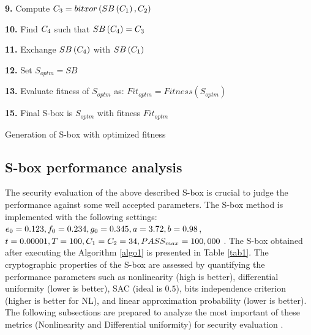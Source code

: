 \documentclass[journal]{IEEEtran/IEEEtran}
\begin{document}
\begin{algorithm}
{     
  \textbf{9.} Compute  ${C_{\rm{3}}} = bitxor\left( {SB\left( {{C_{\rm{1}}}} \right),{C_{\rm{2}}}} \right)$
   

     
  \textbf{10.} Find ${C_{\rm{4}}}$  such that $SB\left( {{C_{\rm{4}}}} \right) = {C_{\rm{3}}}$ 
   

     
  \textbf{11.} Exchange $SB\left( {{C_{\rm{4}}}} \right)$  with $SB\left( {{C_{\rm{1}}}} \right)$
   

     
  \textbf{12.} Set  ${S_{optm}} = SB$
   

     
 \textbf{13.} Evaluate fitness of ${S_{optm}}$ as: $Fi{t_{optm}} = Fitness\left( {{S_{optm}}} \right)$   
    

        
   }
   
   \textbf{15.} Final S-box is ${S_{optm}}$  with fitness $Fi{t_{optm}}$ 
    
   \caption{Generation of S-box with optimized fitness}\label{algo1}
\end{algorithm}
\subsection{S-box performance analysis}

The security evaluation of the above described S-box is crucial to judge the performance against some well accepted parameters. The S-box method is implemented with the following settings: ${e_0} = 0.123,{\rm{ }}{f_0} = 0.234,{\rm{ }}{g_0} = 0.345,{\rm{ }}a = 3.72,{\rm{ }}b = 0.98$, $t = 0.00001,{\rm{ }}T = 100,{\rm{ }}{C_1} = {C_2} = 34,{\rm{ }}PAS{S_{max}} = 100,000$ . The S-box obtained after executing the Algorithm \ref{algo1} is presented in Table \ref{tab1}. The cryptographic properties of the S-box are assessed by quantifying the performance parameters such as nonlinearity (high is better), differential uniformity (lower is better), SAC (ideal is $0.5$), bits independence criterion (higher is better for NL), and linear approximation probability (lower is better). The following subsections are prepared to analyze the most important of these metrics (Nonlinearity and Differential uniformity) for security evaluation \cite{ahmad2018random}.
\end{document}
